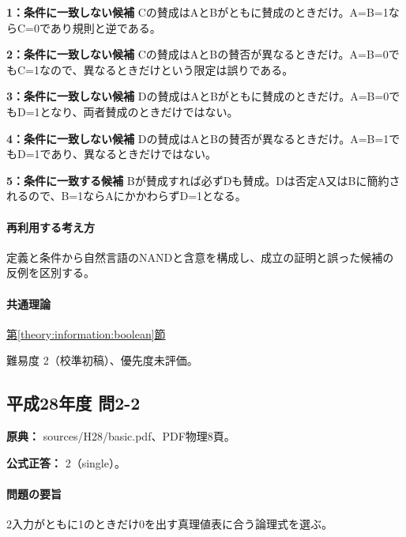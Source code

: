 \noindent\textbf{1：条件に一致しない候補} Cの賛成はAとBがともに賛成のときだけ。A=\allowbreak{}B=\allowbreak{}1ならC=\allowbreak{}0であり規則と逆である。\par

\noindent\textbf{2：条件に一致しない候補} Cの賛成はAとBの賛否が異なるときだけ。A=\allowbreak{}B=\allowbreak{}0でもC=\allowbreak{}1なので、異なるときだけという限定は誤りである。\par

\noindent\textbf{3：条件に一致しない候補} Dの賛成はAとBがともに賛成のときだけ。A=\allowbreak{}B=\allowbreak{}0でもD=\allowbreak{}1となり、両者賛成のときだけではない。\par

\noindent\textbf{4：条件に一致しない候補} Dの賛成はAとBの賛否が異なるときだけ。A=\allowbreak{}B=\allowbreak{}1でもD=\allowbreak{}1であり、異なるときだけではない。\par

\noindent\textbf{5：条件に一致する候補} Bが賛成すれば必ずDも賛成。Dは否定A又はBに簡約されるので、B=\allowbreak{}1ならAにかかわらずD=\allowbreak{}1となる。\par

\paragraph{再利用する考え方} 定義と条件から自然言語のNANDと含意を構成し、成立の証明と誤った候補の反例を区別する。

\paragraph{共通理論} \hyperref[theory:information:boolean]{第\ref*{theory:information:boolean}節}

\par 難易度 2（校準初稿）、優先度未評価。

\subsection{平成28年度 問2-2}
\label{q:h28-reg-basic-2-2}

\noindent\textbf{原典：} sources/H28/basic.pdf、PDF物理8頁。

\textbf{公式正答：} 2（single）。

\paragraph{問題の要旨} 2入力がともに1のときだけ0を出す真理値表に合う論理式を選ぶ。

